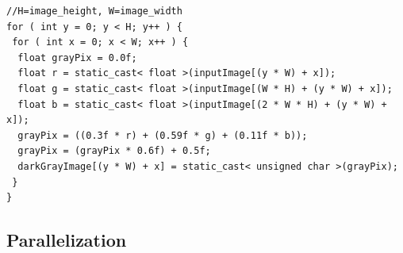 \documentclass[a4paper]{article}
\begin{document}
\begin{lstlisting}[label=dsc, caption=Darker Sequential code]
//H=image_height, W=image_width
for ( int y = 0; y < H; y++ ) {
 for ( int x = 0; x < W; x++ ) {
  float grayPix = 0.0f;
  float r = static_cast< float >(inputImage[(y * W) + x]);
  float g = static_cast< float >(inputImage[(W * H) + (y * W) + x]);
  float b = static_cast< float >(inputImage[(2 * W * H) + (y * W) + x]);
  grayPix = ((0.3f * r) + (0.59f * g) + (0.11f * b));
  grayPix = (grayPix * 0.6f) + 0.5f;
  darkGrayImage[(y * W) + x] = static_cast< unsigned char >(grayPix);
 }
}
\end{lstlisting}
\FloatBarrier

\subsection{Parallelization}
\label{sec:p1}
\end{document}
